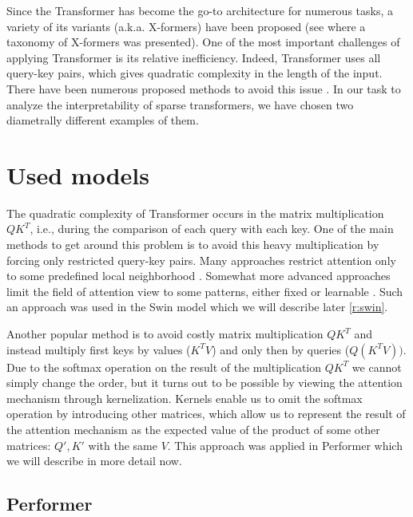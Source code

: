 \documentclass[en]{pracamgr}
\begin{document}
Since the Transformer has become the go-to architecture for numerous tasks, a variety of its variants (a.k.a. X-formers) have been proposed (see \cite{DBLP:journals/corr/abs-2106-04554} where a taxonomy of X-formers was presented). One of the most important challenges of applying Transformer is its relative inefficiency. Indeed, Transformer uses all query-key pairs, which gives quadratic complexity in the length of the input. There have been numerous proposed methods to avoid this issue \cite{DBLP:journals/csur/TayDBM23}. In our task to analyze the interpretability of sparse transformers, we have chosen two diametrally different examples of them.

\chapter{Used models}\label{r:sparse_transformers}

The quadratic complexity of Transformer occurs in the matrix multiplication $QK^T$, i.e., during the comparison of each query with each key. One of the main methods to get around this problem is to avoid this heavy multiplication by forcing only restricted query-key pairs. Many approaches restrict attention only to some predefined local neighborhood \cite{DBLP:conf/icml/ParmarVUKSKT18}. Somewhat more advanced approaches limit the field of attention view to some patterns, either fixed or learnable \cite{DBLP:journals/csur/TayDBM23}. Such an approach was used in the Swin model \cite{DBLP:conf/iccv/LiuL00W0LG21} which we will describe later \ref{r:swin}.

Another popular method is to avoid costly matrix multiplication $QK^T$ and instead multiply first keys by values ($K^TV$) and only then by queries ($Q(K^TV))$. Due to the softmax operation on the result of the multiplication $QK^T$ we cannot simply change the order, but it turns out to be possible by viewing the attention mechanism through kernelization. Kernels enable us to omit the softmax operation by introducing other matrices, which allow us to represent the result of the attention mechanism as the expected value of the product of some other matrices: $Q', K'$ with the same $V$. This approach was applied in Performer \cite{DBLP:conf/iclr/ChoromanskiLDSG21} which we will describe in more detail now.


\section{Performer}\label{r:performer}
\end{document}

